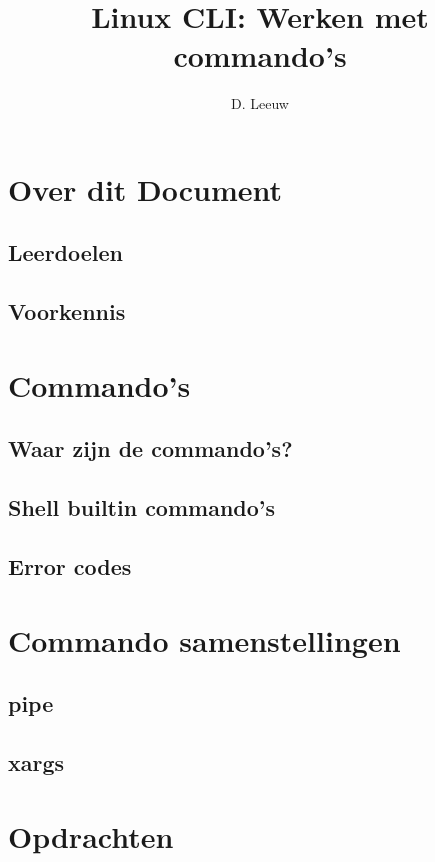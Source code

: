 \documentclass[a4paper,12pt,twoside,openright,titlepage]{article}
\author{D. Leeuw}
\title{Linux CLI: Werken met commando's}
\date{\today\\
\vfill
\raggedright
\copyright\ 2020-2025 Dennis Leeuw\\
}
\begin{document}

\maketitle


\section{Over dit Document}
\subsection{Leerdoelen}

\subsection{Voorkennis}



\section{Commando's}

\subsection{Waar zijn de commando's?}


\subsection{Shell builtin commando's}

\subsection{Error codes}

\section{Commando samenstellingen}

\subsection{pipe}

\subsection{xargs}

\section{Opdrachten}


\printindex
\end{document}
